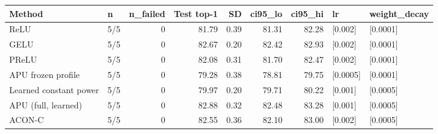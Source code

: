 \begin{tabular}{llrrrrrll}
\toprule
Method & n & n\_failed & Test top-1 & SD & ci95\_lo & ci95\_hi & lr & weight\_decay \\
\midrule
ReLU & 5/5 & 0 & 81.79 & 0.39 & 81.31 & 82.28 & [0.002] & [0.0001] \\
GELU & 5/5 & 0 & 82.67 & 0.20 & 82.42 & 82.93 & [0.002] & [0.0001] \\
PReLU & 5/5 & 0 & 82.08 & 0.31 & 81.70 & 82.47 & [0.002] & [0.0001] \\
APU frozen profile & 5/5 & 0 & 79.28 & 0.38 & 78.81 & 79.75 & [0.0005] & [0.0001] \\
Learned constant power & 5/5 & 0 & 79.97 & 0.20 & 79.71 & 80.22 & [0.001] & [0.0005] \\
APU (full, learned) & 5/5 & 0 & 82.88 & 0.32 & 82.48 & 83.28 & [0.001] & [0.0005] \\
ACON-C & 5/5 & 0 & 82.55 & 0.36 & 82.10 & 83.00 & [0.002] & [0.0005] \\
\bottomrule
\end{tabular}
